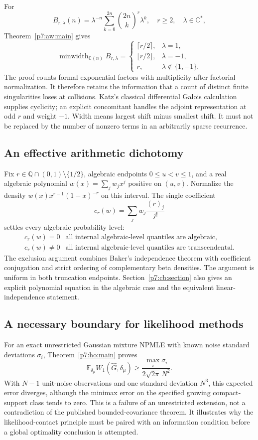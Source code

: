 \documentclass[11pt,a4paper]{article}
\theoremstyle{definition}
\theoremstyle{remark}
\numberwithin{equation}{section}
\begin{document}
For
\[
 B_{r,\lambda}(n)=\lambda^{-n}
      \sum_{k=0}^{2n}\binom{2n}{k}^{r}\lambda^k,
 \quad r\ge2,\quad\lambda\in\mathbb C^*,
\]
Theorem~\ref{p7:aw:main} gives
\[
 \operatorname{minwidth}_{\mathbb C(n)}B_{r,\lambda}
 =\begin{cases}
 \lceil r/2\rceil,&\lambda=1,\\
 \lfloor r/2\rfloor,&\lambda=-1,\\
 r,&\lambda\notin\{1,-1\}.
 \end{cases}
\]
The proof counts formal exponential factors with multiplicity after
factorial normalization. It therefore retains the information that
a count of distinct finite singularities loses at collisions.
Katz's classical differential Galois calculation supplies cyclicity;
an explicit concomitant handles the adjoint representation at odd
$r$ and weight $-1$. Width means largest shift minus smallest shift.
It must not be replaced by the number of nonzero terms in an
arbitrarily sparse recurrence.

\subsection{An effective arithmetic dichotomy}

Fix $r\in\mathbb Q\cap(0,1)\setminus\{1/2\}$, algebraic endpoints
$0\le u<v\le1$, and a real algebraic polynomial
$w(x)=\sum_jw_jx^j$ positive on $(u,v)$. Normalize the density
$w(x)x^{r-1}(1-x)^{-r}$ on this interval. The single coefficient
\[
                   c_r(w)=\sum_jw_j\frac{(r)_j}{j!}
\]
settles every algebraic probability level:
\[
\begin{array}{c|c}
c_r(w)=0&\text{all internal algebraic-level quantiles are algebraic},\\
c_r(w)\ne0&\text{all internal algebraic-level quantiles are transcendental}.
\end{array}
\]
The exclusion argument combines Baker's independence theorem with
coefficient conjugation and strict ordering of complementary beta
densities. The argument is uniform in both truncation endpoints.
Section~\ref{p7:cb:section} also gives an explicit polynomial equation
in the algebraic case and the equivalent linear-independence statement.

\subsection{A necessary boundary for likelihood methods}

For an exact unrestricted Gaussian mixture NPMLE with known noise
standard deviations $\sigma_i$, Theorem~\ref{p7:ho:main} proves
\[
 \mathbb E_{\delta_\mu}W_1(\widehat G,\delta_\mu)
       \ge\frac{\max_i\sigma_i}{2\sqrt{2\pi}\,N^2}.
\]
With $N-1$ unit-noise observations and one standard deviation $N^3$,
this expected error diverges, although the minimax error on the
specified growing compact-support class tends to zero. This is a
failure of an unrestricted extension, not a contradiction of the
published bounded-covariance theorem. It illustrates why the
likelihood-contact principle must be paired with an information
condition before a global optimality conclusion is attempted.
\end{document}

